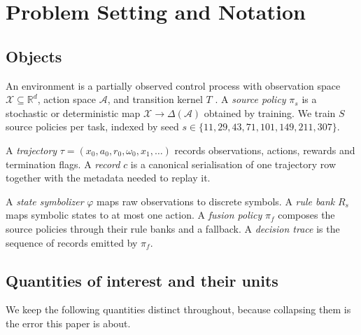 \documentclass[11pt,a4paper]{article}
\begin{document}
\section{Problem Setting and Notation}
\label{sec:setting}

\subsection{Objects}

An environment is a partially observed control process with observation space $\mathcal{X}\subseteq\mathbb{R}^{d}$, action space $\mathcal{A}$, and transition kernel $T$ \citep{sutton2018}. A \emph{source policy} $\pi_{s}$ is a stochastic or deterministic map $\mathcal{X}\to\Delta(\mathcal{A})$ obtained by training. We train $S$ source policies per task, indexed by seed $s\in\{11,29,43,71,101,149,211,307\}$.

A \emph{trajectory} $\tau = (x_{0},a_{0},r_{0},\omega_{0},x_{1},\dots)$ records observations, actions, rewards and termination flags. A \emph{record} $c$ is a canonical serialisation of one trajectory row together with the metadata needed to replay it.

A \emph{state symbolizer} $\varphi$ maps raw observations to discrete symbols. A \emph{rule bank} $R_{s}$ maps symbolic states to at most one action. A \emph{fusion policy} $\pi_{f}$ composes the source policies through their rule banks and a fallback. A \emph{decision trace} is the sequence of records emitted by $\pi_{f}$.

\subsection{Quantities of interest and their units}

We keep the following quantities distinct throughout, because collapsing them is the error this paper is about.
\end{document}
